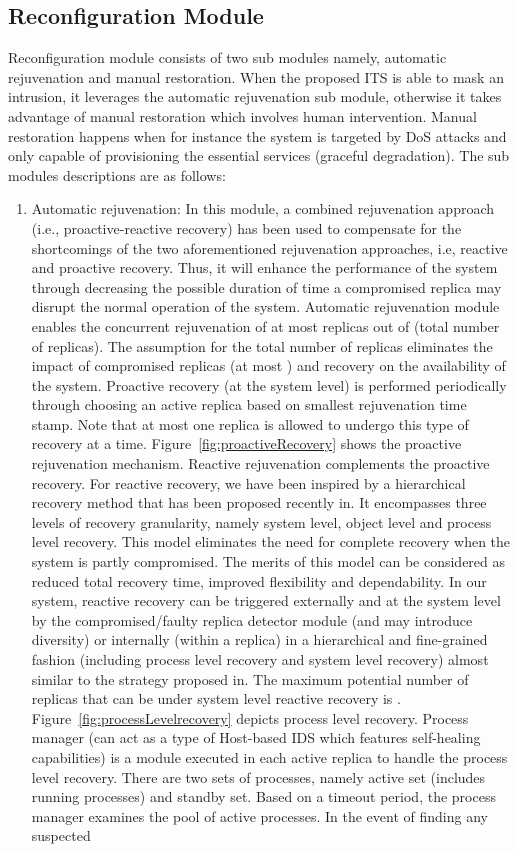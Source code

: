 \documentclass[preprint,number,12pt]{elsarticle}
\begin{document}
\subsection{Reconfiguration Module}
Reconfiguration module consists of two sub modules namely, automatic rejuvenation and manual restoration. When the proposed ITS is able to mask an intrusion, it leverages the automatic rejuvenation sub module, otherwise it takes advantage of manual restoration which involves human intervention.
Manual restoration happens when for instance the system is targeted by DoS attacks and only capable of provisioning the essential services
(graceful degradation). The sub modules descriptions are as follows:
\begin {enumerate}
\item Automatic rejuvenation: In this module, a combined rejuvenation approach (i.e., proactive-reactive recovery) has been used to compensate for the shortcomings of the two aforementioned rejuvenation approaches, i.e, reactive and proactive recovery. Thus, it will enhance the performance of the system through decreasing the possible duration of time a compromised replica may disrupt the normal operation of the system\citep{Sousa2010}. Automatic rejuvenation module enables the concurrent rejuvenation of at most  replicas out of  (total number of replicas). The assumption for the total number of replicas eliminates the impact of compromised replicas (at most ) and recovery on the availability of the system. Proactive recovery (at the system level) is performed periodically through choosing an active replica based on smallest rejuvenation time stamp. Note that at most one replica is allowed to undergo this type of recovery at a time. Figure~\ref{fig:proactiveRecovery} shows the proactive rejuvenation mechanism. Reactive rejuvenation complements the proactive recovery. For reactive recovery, we have been inspired by a hierarchical recovery method that has been proposed recently in\citep{springerlink:10.1007/978-3-642-23971-7_36}. It encompasses three levels of recovery granularity, namely system level, object level and process level recovery. This model eliminates the need for complete recovery when the system is partly compromised. The merits of this model can be considered as reduced total recovery time, improved flexibility and dependability. In our system, reactive recovery can be triggered externally and at the system level by the compromised/faulty replica detector module (and may introduce diversity) or internally (within a replica) in a hierarchical and fine-grained fashion (including process level recovery and system level recovery) almost similar to the strategy proposed in\citep{springerlink:10.1007/978-3-642-23971-7_36}. The maximum potential number of replicas that can be under system level reactive recovery is . Figure~\ref{fig:processLevelrecovery} depicts process level recovery. Process manager (can act as a type of Host-based IDS which features self-healing capabilities) is a module executed in each active replica to handle the process level recovery. There are two sets of processes, namely active set (includes running processes) and standby set. Based on a timeout period, the process manager examines the pool of active processes.  In the event of finding any suspected 
\end{enumerate}
\end{document}

